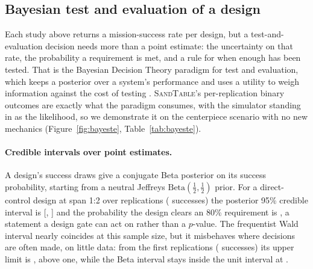 \documentclass[11pt]{article}
\newcommand{\sandtable}{\textsc{SandTable}}
\begin{document}
\subsection{Bayesian test and evaluation of a design}
\label{subsec:bayeste}

Each study above returns a mission-success rate per design, but a test-and-evaluation decision needs more than a point estimate: the uncertainty on that rate, the probability a requirement is met, and a rule for when enough has been tested. That is the Bayesian Decision Theory paradigm for test and evaluation, which keeps a posterior over a system's performance and uses a utility to weigh information against the cost of testing \citep{ferry2023edou,ferry2024paradigm}. \sandtable{}'s per-replication binary outcomes are exactly what the paradigm consumes, with the simulator standing in as the likelihood, so we demonstrate it on the centerpiece scenario with no new mechanics (Figure~\ref{fig:bayeste}, Table~\ref{tab:bayeste}).

\paragraph{Credible intervals over point estimates.} A design's success draws give a conjugate Beta
posterior on its success probability, starting from a neutral Jeffreys $\mathrm{Beta}(\tfrac12,\tfrac12)$ prior. For a direct-control design at span 1:2 over \bteN{} replications (\bteHits{} successes) the posterior 95\% credible interval is [\bteBetaLo{}, \bteBetaHi{}] and the probability the design clears an 80\% requirement is \bteComplyEighty{}, a statement a design gate can act on rather than a $p$-value. The frequentist Wald interval nearly coincides at this sample size, but it misbehaves where decisions are often made, on little data: from the first \bteSmallN{} replications (\bteSmallHits{} successes) its upper limit is \bteWaldHiSmall{}, above one, while the Beta interval stays inside the unit interval at \bteBetaHiSmall{}.
\end{document}
